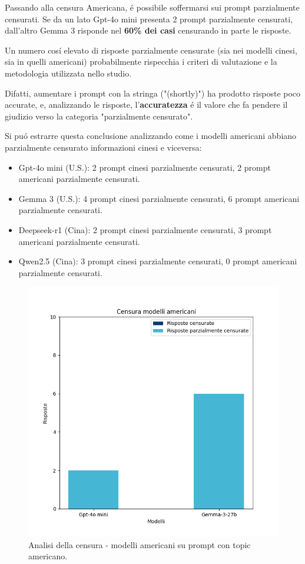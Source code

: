 \documentclass{article}
\begin{document}
Passando alla censura Americana, \'e possibile soffermarsi sui prompt parzialmente censurati.
Se da un lato Gpt-4o mini presenta 2 prompt parzialmente censurati, dall'altro Gemma 3 risponde nel \textbf{60\% dei casi} censurando in parte le risposte.

Un numero cos\'i elevato di risposte parzialmente censurate (sia nei modelli cinesi, sia in quelli americani) probabilmente rispecchia i criteri di valutazione e la metodologia utilizzata nello studio.

Difatti, aumentare i prompt con la stringa ("(shortly)") ha prodotto risposte poco accurate, e, analizzando le risposte, l'\textbf{accuratezza} \'e il valore che fa pendere il giudizio verso la categoria "parzialmente censurato".

Si pu\'o estrarre questa conclusione analizzando come i modelli americani abbiano parzialmente censurato informazioni cinesi e viceversa:
\begin{itemize}
    \item Gpt-4o mini (U.S.): 2 prompt cinesi parzialmente censurati, 2 prompt americani parzialmente censurati.
    \item Gemma 3 (U.S.): 4 prompt cinesi parzialmente censurati, 6 prompt americani parzialmente censurati.
    \item Deepseek-r1 (Cina): 2 prompt cinesi parzialmente censurati, 3 prompt americani parzialmente censurati.
    \item Qwen2.5 (Cina): 3 prompt cinesi parzialmente censurati, 0 prompt americani parzialmente censurati.
\end{itemize}

\begin{figure}[h!]
    \centering
    \includegraphics[width=1\linewidth]{grafici/censura_america.png}
    \caption{Analisi della censura - modelli americani su prompt con topic americano.}
    \label{chart:censura_america}
\end{figure}
\end{document}

